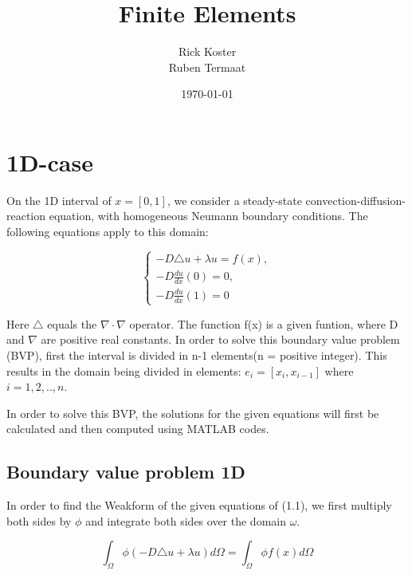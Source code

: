 \documentclass[a4paper]{report}
\begin{document}
\title{\Huge Finite Elements}
\author{Rick Koster \\ Ruben Termaat}
\date{\today}
	
\maketitle

\tableofcontents


\chapter{1D-case}



On the 1D interval of $x = [0,1]  $, we consider a steady-state convection-diffusion-reaction equation, with homogeneous Neumann boundary conditions. The following equations apply to this domain:

\begin{equation}
\begin{cases} 
-D\triangle u + \lambda u = f(x),\\ -D\frac{du}{dx}(0) = 0 ,\\ -D\frac{du}{dx}(1) = 0
\end{cases} 
\end{equation}
\bigskip

Here $ \triangle$ equals the $\nabla \cdot \nabla$ operator. The function f(x) is a given funtion, where D and $\nabla$ are positive real constants. In order to solve this boundary value problem (BVP), first the interval is divided in n-1 elements(n = positive integer). This results in the domain being divided in elements: $e_i = [x_i, x_{i-1}]$ where $i={1,2,..,n}$. 

In order to solve this BVP, the solutions for the given equations will first be calculated and then computed using MATLAB codes.


\section{Boundary value problem 1D}
\vspace{5mm}

In order to find the Weakform of the given equations of (1.1), we first multiply both sides by $\phi$ and integrate both sides over the domain $\omega$.


\begin{equation}
	 \int_{\Omega} \phi(-D\triangle u + \lambda u )d\Omega = \int_{\Omega} \phi f(x) d\Omega 
\end{equation}	
\smallskip
\end{document}
